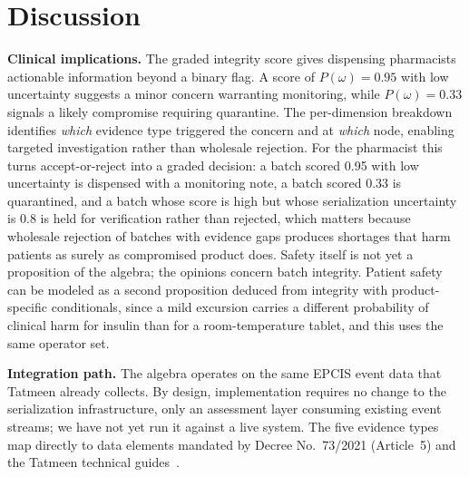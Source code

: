 \documentclass[conference]{IEEEtran}
\begin{document}
\section{Discussion}

\textbf{Clinical implications.} The graded integrity score gives
dispensing pharmacists actionable information beyond a binary flag. A
score of $P(\omega) = 0.95$ with low uncertainty suggests a minor
concern warranting monitoring, while $P(\omega) = 0.33$ signals a
likely compromise requiring quarantine. The per-dimension breakdown
identifies \textit{which} evidence type triggered the concern and at
\textit{which} node, enabling targeted investigation rather than
wholesale rejection. For the pharmacist this turns accept-or-reject into
a graded decision: a batch scored 0.95 with low uncertainty is dispensed
with a monitoring note, a batch scored 0.33 is quarantined, and a batch
whose score is high but whose serialization uncertainty is 0.8 is held
for verification rather than rejected, which matters because wholesale
rejection of batches with evidence gaps produces shortages that harm
patients as surely as compromised product does. Safety itself is not yet
a proposition of the algebra; the opinions concern batch integrity.
Patient safety can be modeled as a second proposition deduced from
integrity with product-specific conditionals, since a mild excursion
carries a different probability of clinical harm for insulin than for a
room-temperature tablet, and this uses the same operator set.

\textbf{Integration path.} The algebra operates on the same EPCIS event
data that Tatmeen already collects. By design, implementation requires
no change to the serialization infrastructure, only an assessment layer
consuming existing event streams; we have not yet run it against a live
system. The five evidence types map directly
to data elements mandated by Decree No.~73/2021 (Article~5) and the
Tatmeen technical guides~\cite{tatmeen_mfg_v5, tatmeen_logistics_v5}.
\end{document}
